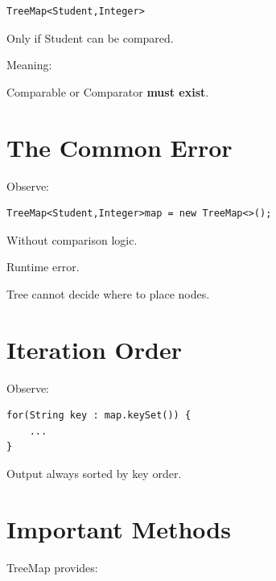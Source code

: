 \documentclass[11pt,a4paper]{book}
\begin{document}
\begin{verbatim} 
TreeMap<Student,Integer>
\end{verbatim}

Only if Student can be compared.


Meaning:

\textcolor{RosettaJade}{Comparable}
or
\textcolor{RosettaJade}{Comparator}
\textbf{must exist}.


\section{The Common Error}

Observe:

\begin{verbatim} 
TreeMap<Student,Integer>map = new TreeMap<>();
\end{verbatim}


Without comparison logic.


\textcolor{RosettaOrange}{Runtime error}.


Tree cannot decide where
to place nodes.

\section{Iteration Order}

Observe:

\begin{verbatim} 
for(String key : map.keySet()) {
    ...
}
\end{verbatim}
Output always sorted
by key order.


\section{Important Methods}

TreeMap provides:
\end{document}
